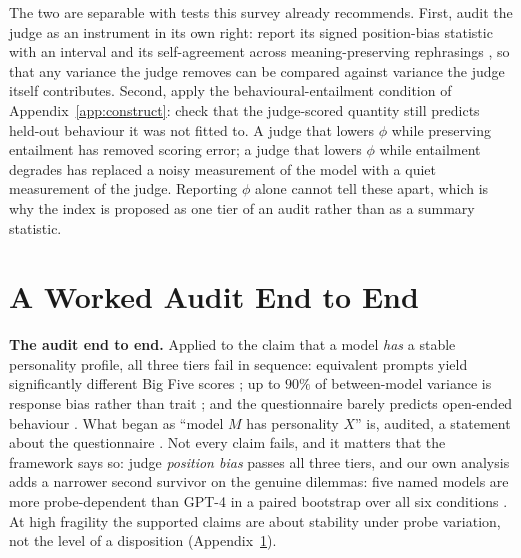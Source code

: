\documentclass[11pt]{article}
\begin{document}
The two are separable with tests this survey already recommends. First, audit
the judge as an instrument in its own right: report its signed position-bias
statistic with an interval and its self-agreement across meaning-preserving
rephrasings \cite{bellibatlu2026judgesense}, so that any variance the judge
removes can be compared against variance the judge itself contributes. Second,
apply the behavioural-entailment condition of
Appendix~\ref{app:construct}: check that the judge-scored quantity still
predicts held-out behaviour it was not fitted to. A judge that lowers $\phi$
while preserving entailment has removed scoring error; a judge that lowers
$\phi$ while entailment degrades has replaced a noisy measurement of the model
with a quiet measurement of the judge. Reporting $\phi$ alone cannot tell these
apart, which is why the index is proposed as one tier of an audit rather than as
a summary statistic.

\section{A Worked Audit End to End}
\label{app:casestudy}

\textbf{The audit end to end.} Applied to the claim that a model \emph{has} a
stable personality profile, all three tiers fail in sequence: equivalent prompts
yield significantly different Big Five scores \cite{gupta2024self,shu2024dont};
up to $90\%$ of between-model variance is response bias rather than trait
\cite{meyer2026apparent}; and the questionnaire barely predicts open-ended
behaviour \cite{song2025psychometric}. What began as ``model $M$ has personality
$X$'' is, audited, a statement about the questionnaire
\cite{suhr2023challenging}. Not every claim fails, and it matters that the
framework says so: judge \emph{position bias} passes all three tiers, and our own
analysis adds a narrower second survivor on the genuine dilemmas: five named
models are more probe-dependent than GPT-4 in a paired bootstrap over all six
conditions
\cite{shi2025judging,wang2024fair,li2025calibraeval}. At high
fragility the supported claims are about stability under probe variation, not
the level of a disposition (Appendix~\ref{app:casestudy}).
\end{document}
